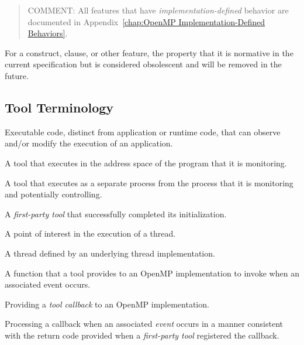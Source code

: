 \begin{quote}
COMMENT: All features that have \emph{implementation-defined} behavior
are documented in Appendix~\ref{chap:OpenMP Implementation-Defined Behaviors}.
\end{quote}
\glossarydefend

\glossarydefstart
For a construct, clause, or other feature, the property that it is normative 
in the current specification but is considered obsolescent and will be 
removed in the future.
\glossarydefend


\subsection{Tool Terminology}

\glossarydefstart
Executable code, distinct from application or runtime code, that can observe 
and/or modify the execution of an application.
\glossarydefend

\glossarydefstart
A tool that executes in the address space of the program that it is monitoring.
\glossarydefend

\glossarydefstart
A tool that executes as a separate process from the process that it is 
monitoring and potentially controlling.
\glossarydefend

\glossarydefstart
A \emph{first-party tool} that successfully completed its initialization.
\glossarydefend

\glossarydefstart
A point of interest in the execution of a thread.
\glossarydefend

\glossarydefstart
A thread defined by an underlying thread implementation.
\glossarydefend

\glossarydefstart
A function that a tool provides to an OpenMP implementation to 
invoke when an associated event occurs.
\glossarydefend

\glossarydefstart
Providing a \emph{tool callback} to an OpenMP implementation.
\glossarydefend

\glossarydefstart
Processing a callback when an associated \emph{event} occurs in a manner 
consistent with the return code provided when a \emph{first-party tool} 
registered the callback.
\glossarydefend

